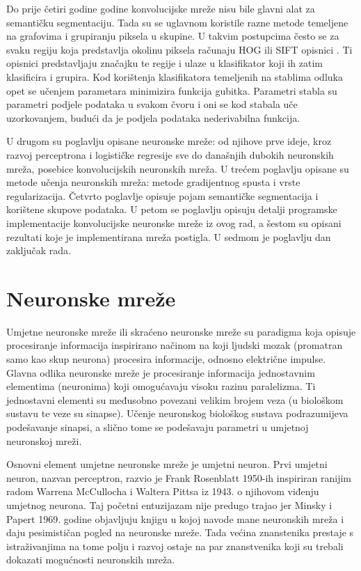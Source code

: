 \documentclass[times, utf8, diplomski, numeric]{fer}
\begin{document}
Do prije četiri godine godine konvolucijske mreže nisu bile glavni alat za semantičku segmentaciju. Tada su se uglavnom koristile razne metode temeljene na grafovima i grupiranju piksela u skupine. U takvim postupcima često se za svaku regiju koja predstavlja okolinu piksela računaju HOG  ili SIFT  opisnici \cite{Lowe:1999}. Ti opisnici predstavljaju značajku te regije i ulaze u klasifikator koji ih zatim klasificira i grupira.
Kod korištenja klasifikatora temeljenih na stablima odluka opet se učenjem parametara minimizira funkcija gubitka. Parametri stabla su parametri podjele podataka u svakom čvoru  i oni se kod stabala uče uzorkovanjem, budući da je podjela podataka nederivabilna funkcija.

U drugom su poglavlju opisane neuronske mreže: od njihove prve ideje, kroz razvoj perceptrona i logističke regresije sve do današnjih dubokih neuronskih mreža, posebice konvolucijskih neuronskih mreža. U trećem poglavlju opisane su metode učenja neuronskih mreža: metode gradijentnog spusta i vrste regularizacija. Četvrto poglavlje opisuje pojam semantičke segmentacija i korištene skupove podataka. U petom se poglavlju opisuju detalji programske implementacije konvolucijske neuronske mreže iz ovog rad, a šestom su opisani rezultati koje je implementirana mreža postigla. U sedmom je poglavlju dan zaključak rada.

\chapter{Neuronske mreže}

Umjetne neuronske mreže  ili skraćeno neuronske mreže su paradigma koja opisuje procesiranje informacija inspirirano načinom na koji ljudski mozak (promatran samo kao skup neurona) procesira informacije, odnosno električne impulse. Glavna odlika neuronske mreže je procesiranje informacija jednostavnim elementima (neuronima) koji omogućavaju visoku razinu paralelizma. Ti jednostavni elementi su međusobno povezani velikim brojem veza (u biološkom sustavu te veze su sinapse). Učenje neuronskog biološkog sustava podrazumijeva podešavanje sinapsi, a slično tome se podešavaju parametri u umjetnoj neuronskoj mreži.

Osnovni element umjetne neuronske mreže je umjetni neuron. Prvi umjetni neuron, nazvan perceptron, razvio je Frank Rosenblatt 1950-ih inspiriran ranijim radom \cite{mcculloch43a}  Warrena  McCullocha i Waltera Pittsa iz 1943. o njihovom viđenju umjetnog neurona. Taj početni entuzijazam nije predugo trajao jer Minsky i Papert 1969. godine objavljuju knjigu \cite{minsky69perceptrons} u kojoj navode mane neuronskih mreža i daju pesimističan pogled na neuronske mreže. Tada većina znanstenika prestaje s istraživanjima na tome polju i razvoj ostaje na par znanstvenika koji su trebali dokazati mogućnosti neuronskih mreža.
\end{document}
